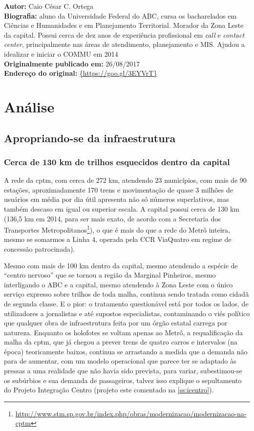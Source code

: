 \documentclass[11pt,fleqn]{book} %
\newcommand{\infocaio}[2]{\textbf{Autor:} Caio C\'{e}sar C. Ortega \\ \textbf{Biografia:} aluno da Universidade Federal do ABC, cursa os bacharelados em Ci\^{e}ncias e Humanidades e em Planejamento Territorial. Morador da Zona Leste da capital. Possui cerca de dez anos de experi\^{e}ncia profissional em \textit{call} e \textit{contact center}, principalmente nas \'{a}reas de atendimento, planejamento e MIS. Ajudou a idealizar e iniciar o COMMU em 2014 \\ \textbf{Originalmente publicado em:} {#1} \\ \textbf{Endere\c{c}o do original:} \url{{#2}}}
\begin{document}
\begin{info}
	\infocaio{26/08/2017}{https://goo.gl/3EYVrT}
\end{info}


\part{Análise}

\chapter{Apropriando-se da infraestrutura}

\section{Cerca de 130 km de trilhos esquecidos dentro da capital}

A rede da \gls{cptm}, com cerca de 272 km, atendendo 23 municípios, com mais de 90 estações, aproximadamente 170 trens e movimentação de quase 3 milhões de usuários em média por dia útil apresenta não só números superlativos, mas também descaso em igual ou superior escala. A capital possui cerca de 130 km (136,5 km em 2014, para ser mais exato, de acordo com a Secretaria dos Transportes Metropolitanos\footnote{\url{http://www.stm.sp.gov.br/index.php/obras/modernizacao/modernizacao-na-cptm}}), o que é mais do que a rede do Metrô inteira, mesmo se somarmos a Linha 4, operada pela CCR ViaQuatro em regime de concessão patrocinada).

Mesmo com mais de 100 km dentro da capital, mesmo atendendo a espécie de “centro nervoso” que se tornou a região da Marginal Pinheiros, mesmo interligando o ABC e a capital, mesmo atendendo à Zona Leste com o único serviço expresso sobre trilhos de toda malha, continua sendo tratada como cidadã de segunda classe. E o pior: o tratamento questionável está por todos os lados, de utilizadores a jornalistas e até supostos especialistas, contaminando o viés político que qualquer obra de infraestrutura feita por um órgão estatal carrega por natureza. Enquanto os holofotes se voltam apenas ao Metrô, a requalificação da malha da \gls{cptm}, que já chegou a prever trens de quatro carros e intervalos (na época) teoricamente baixos, continua se arrastando a medida que a demanda não para de aumentar, com um modelo operacional que parece ter se adaptado às pressas a uma realidade que não havia sido prevista, para variar, subestimou-se os subúrbios e sua demanda de passageiros, talvez isso explique o sepultamento do Projeto Integração Centro (projeto este comentado na \autoref{ss:icentro}).
\end{document}
